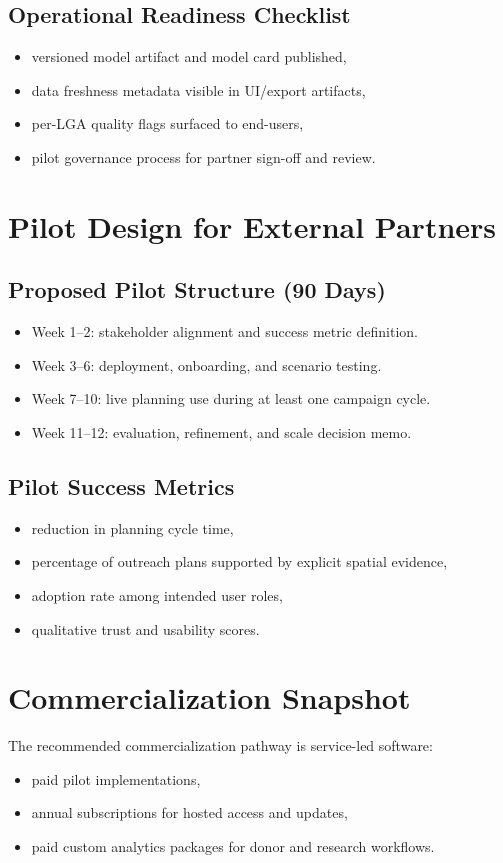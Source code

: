 \documentclass[11pt]{article}
\begin{document}
\subsection{Operational Readiness Checklist}
\begin{itemize}[leftmargin=1.5em]
  \item versioned model artifact and model card published,
  \item data freshness metadata visible in UI/export artifacts,
  \item per-LGA quality flags surfaced to end-users,
  \item pilot governance process for partner sign-off and review.
\end{itemize}

\section{Pilot Design for External Partners}
\subsection{Proposed Pilot Structure (90 Days)}
\begin{itemize}[leftmargin=1.5em]
  \item Week 1--2: stakeholder alignment and success metric definition.
  \item Week 3--6: deployment, onboarding, and scenario testing.
  \item Week 7--10: live planning use during at least one campaign cycle.
  \item Week 11--12: evaluation, refinement, and scale decision memo.
\end{itemize}

\subsection{Pilot Success Metrics}
\begin{itemize}[leftmargin=1.5em]
  \item reduction in planning cycle time,
  \item percentage of outreach plans supported by explicit spatial evidence,
  \item adoption rate among intended user roles,
  \item qualitative trust and usability scores.
\end{itemize}

\section{Commercialization Snapshot}
The recommended commercialization pathway is service-led software:
\begin{itemize}[leftmargin=1.5em]
  \item paid pilot implementations,
  \item annual subscriptions for hosted access and updates,
  \item paid custom analytics packages for donor and research workflows.
\end{itemize}
\end{document}
